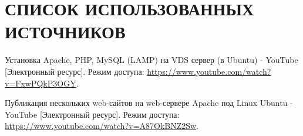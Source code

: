 \newpage

\begingroup
  \section*{СПИСОК ИСПОЛЬЗОВАННЫХ ИСТОЧНИКОВ}

  \renewcommand{\addcontentsline}[3]{}%
  \renewcommand{\section}[2]{}%

  \begin{thebibliography}{}
	Установка Apache, PHP, MySQL (LAMP) на VDS сервер (в Ubuntu) - YouTube
	[Электронный ресурс].
	Режим доступа: \url{https://www.youtube.com/watch?v=FxwPQkP3OGY}.

	Публикация нескольких web-сайтов на web-сервере Apache под Linux Ubuntu - YouTube
	[Электронный ресурс].
	Режим доступа: \url{https://www.youtube.com/watch?v=A87OkBNZ2Sw}.
  \end{thebibliography}
\endgroup

\newpage
